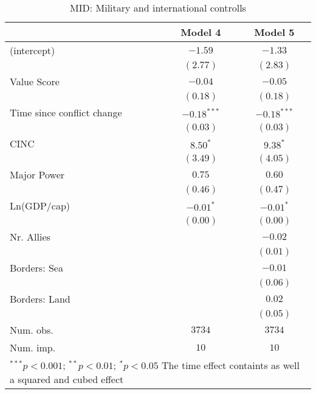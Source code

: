
\begin{table}
\begin{center}
\begin{tabular}{l c c}
\toprule
 & Model 4 & Model 5 \\
\midrule
(intercept)                & $-1.59$       & $-1.33$       \\
                           & $(2.77)$      & $(2.83)$      \\
Value Score                & $-0.04$       & $-0.05$       \\
                           & $(0.18)$      & $(0.18)$      \\
Time since conflict change & $-0.18^{***}$ & $-0.18^{***}$ \\
                           & $(0.03)$      & $(0.03)$      \\
CINC                       & $8.50^{*}$    & $9.38^{*}$    \\
                           & $(3.49)$      & $(4.05)$      \\
Major Power                & $0.75$        & $0.60$        \\
                           & $(0.46)$      & $(0.47)$      \\
Ln(GDP/cap)                & $-0.01^{*}$   & $-0.01^{*}$   \\
                           & $(0.00)$      & $(0.00)$      \\
Nr. Allies                 &               & $-0.02$       \\
                           &               & $(0.01)$      \\
Borders: Sea               &               & $-0.01$       \\
                           &               & $(0.06)$      \\
Borders: Land              &               & $0.02$        \\
                           &               & $(0.05)$      \\
\midrule
Num. obs.                  & $3734$        & $3734$        \\
Num. imp.                  & $10$          & $10$          \\
\bottomrule
\multicolumn{3}{l}{\scriptsize{$^{***}p<0.001$; $^{**}p<0.01$; $^{*}p<0.05$ 
                  The time effect containts as well a squared and cubed effect}}
\end{tabular}
\caption{MID: Military and international controlls}
\label{MID_2}
\end{center}
\end{table}
